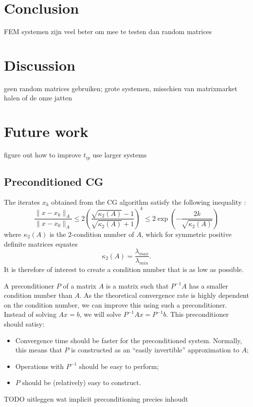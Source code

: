 \documentclass[11pt]{amsart}
\theoremstyle{definition}
\begin{document}
\section{Conclusion}
FEM systemen zijn veel beter om mee te testen dan random matrices

\section{Discussion}
geen random matrices gebruiken; grote systemen, misschien van matrixmarket halen of de onze jatten

\section{Future work}
figure out how to improve $t_{ip}$
use larger systems
\subsection{Preconditioned CG}
The iterates $x_k$ obtained from the CG algorithm satisfy the following inequality \cite[Lect.~7]{sleij}:
\[
  \frac{\|x - x_k\|_A}{\|x - x_0\|_A} \leq 2 \left( \frac{ \sqrt{\kappa_2(A)}-1}{\sqrt{\kappa_2(A)}+1}\right)^k \leq 2 \exp \left( -\frac{2k}{\sqrt{\kappa_2(A)}}\right) 
\]
where $\kappa_2(A)$ is the $2$-condition number of $A$, which for symmetric positive definite matrices equates
\[
  \kappa_2(A) = \frac{\lambda_{max}}{\lambda_{min}}.
\]
It is therefore of interest to create a condition number that is as low as possible.

A preconditioner $P$ of a matrix $A$ is a matrix such that $P^{-1}A$ has a smaller condition number than $A$. As the theoretical convergence rate is highly dependent on the condition number, we can improve this using such a preconditioner. Instead of solving $Ax = b$, we will solve $P^{-1}Ax = P^{-1}b$. This preconditioner should satisy:
\begin{itemize}
  \item Convergence time should be faster for the preconditioned system. Normally, this means that $P$ is constructed as an ``easily invertible'' approximation to $A$;
  \item Operations with $P^{-1}$ should be easy to perform;
  \item $P$ should be (relatively) easy to construct.
\end{itemize}

TODO uitleggen wat implicit preconditioning precies inhoudt
\end{document}
